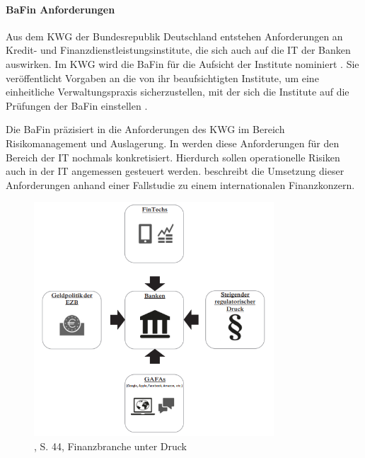 \paragraph{BaFin Anforderungen}
Aus dem \ac{KWG} der Bundesrepublik Deutschland entstehen Anforderungen \cite{MaRisk:2017} an Kredit- und Finanzdienstleistungsinstitute, die sich auch auf die IT der Banken auswirken. Im \ac{KWG} wird die BaFin für die Aufsicht der Institute nominiert \cite{recht/Bornemann2018}. Sie veröffentlicht Vorgaben an die von ihr beaufsichtigten Institute, um eine einheitliche Verwaltungspraxis sicherzustellen, mit der sich die Institute auf die Prüfungen der BaFin einstellen \cite{BaFin:Verwaltungspraxis}. 

Die BaFin präzisiert in \cite{MaRisk:2017} die Anforderungen des \ac{KWG} im Bereich Risikomanagement und Auslagerung. In \cite{BAIT:2018} werden diese Anforderungen für den Bereich der IT nochmals konkretisiert. Hierdurch sollen operationelle Risiken auch in der IT angemessen gesteuert werden. \citet{mci/Knittl2013} beschreibt die Umsetzung dieser Anforderungen anhand einer Fallstudie zu einem internationalen Finanzkonzern.

\begin{figure}[htbp]
 \centering
 \includegraphics[width=0.8\textwidth]{gfx/bankdruck.PNG}
 \caption{\citet{Smolinski2017}, S. 44, Finanzbranche unter Druck}\label{fig:bankdruck}
\end{figure}

